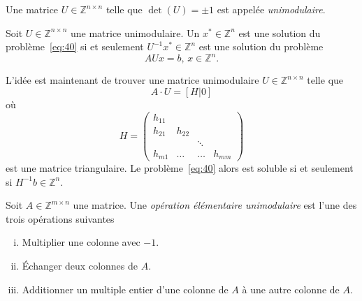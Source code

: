  \begin{definition}
    \label{def:46}
    Une matrice $U ∈ℤ^{n ×n}$ telle que $\det(U) = \pm 1$ est appelée  \emph{unimodulaire}.
  \end{definition}

  \begin{remark}
    Soit $U ∈ℤ^{n ×n}$  une matrice unimodulaire. 
    Un $x^* ∈ ℤ^n$ est une solution du problème~\eqref{eq:40} si et seulement $U^{-1} x^*∈ ℤ^n$ est une solution du problème
    \begin{equation}
      \label{eq:42}
      A U x = b, \, x ∈ℤ^n. 
    \end{equation}
  \end{remark}
L'idée est maintenant de trouver une matrice unimodulaire $U ∈ℤ^{n ×n}$ telle que
\begin{equation}
  \label{eq:44}
  A ⋅ U = [H | 0]
\end{equation}
où
\begin{displaymath}
  H =
  \begin{pmatrix}
    h_{11} \\
    h_{21} & h_{22}\\
    &  & \ddots \\
    h_{m1} & \hdots & \hdots & h_{mm}
  \end{pmatrix}
\end{displaymath}
est une matrice triangulaire. Le problème~\eqref{eq:40} alors est soluble si et seulement si
$H^{-1} b ∈ℤ^n$.

\begin{definition}
  \label{def:47}
  Soit $A ∈ ℤ^{m ×n}$ une matrice. Une \emph{opération élémentaire unimodulaire} est l'une des trois opérations suivantes
  \begin{enumerate}[i)]
    \item Multiplier une colonne avec $-1$.  \label{item:21}
    \item Échanger deux colonnes de $A$.  \label{item:22}
    \item Additionner un multiple entier d'une colonne de $A$ à une autre colonne de $A$. \label{item:23}
  \end{enumerate}
\end{definition}




